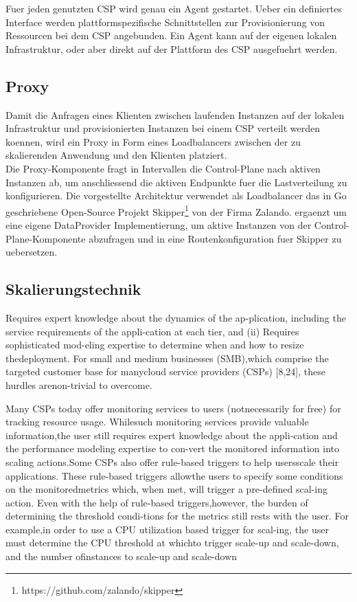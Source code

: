 \documentclass[runningheads]{llncs}
\begin{document}
Fuer jeden genutzten CSP wird genau ein Agent gestartet. Ueber ein definiertes Interface werden plattformspezifische Schnittstellen zur Provisionierung von Ressourcen bei dem CSP angebunden. Ein Agent kann auf der eigenen lokalen Infrastruktur, oder aber direkt auf der Plattform des CSP ausgefuehrt werden.
	
\subsection{Proxy}

Damit die Anfragen eines Klienten zwischen laufenden Instanzen auf der lokalen Infrastruktur und provisionierten Instanzen bei einem CSP verteilt werden koennen, wird ein Proxy in Form eines Loadbalancers zwischen der zu skalierenden Anwendung und den Klienten platziert. \\

Die Proxy-Komponente fragt in Intervallen die Control-Plane nach aktiven Instanzen ab, um anschliessend die aktiven Endpunkte fuer die Lastverteilung zu konfigurieren. Die vorgestellte Architektur verwendet als Loadbalancer das in Go geschriebene Open-Source Projekt Skipper\footnote{https://github.com/zalando/skipper} von der Firma Zalando. ergaenzt um eine eigene DataProvider Implementierung, um aktive Instanzen von der Control-Plane-Komponente abzufragen und in eine Routenkonfiguration fuer Skipper zu uebersetzen.

\subsection{Skalierungstechnik} \label{skalierungstechnik}

Requires expert knowledge about the dynamics of the ap-plication, including the service requirements of the appli-cation at each tier, and (ii) Requires sophisticated mod-eling expertise to determine when and how to resize thedeployment. For small and medium businesses (SMB),which comprise the targeted customer base for manycloud service providers (CSPs) [8,24], these hurdles arenon-trivial to overcome.

Many CSPs today offer monitoring services to users (notnecessarily for free) for tracking resource usage. Whilesuch monitoring services provide valuable information,the user still requires expert knowledge about the appli-cation and the performance modeling expertise to con-vert the monitored information into scaling actions.Some CSPs also offer rule-based triggers to help usersscale their applications. These rule-based triggers allowthe users to specify some conditions on the monitoredmetrics which, when met, will trigger a pre-defined scal-ing action.  Even with the help of rule-based triggers,however, the burden of determining the threshold condi-tions for the metrics still rests with the user. For example,in order to use a CPU utilization based trigger for scal-ing, the user must determine the CPU threshold at whichto trigger scale-up and scale-down, and the number ofinstances to scale-up and scale-down
\end{document}
